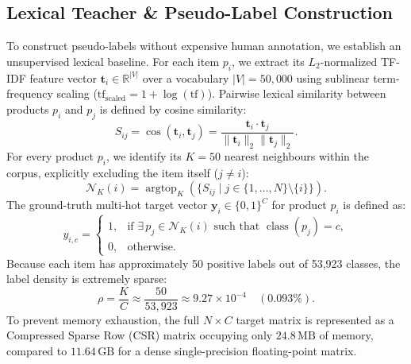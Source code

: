 \documentclass[11pt]{article}
\begin{document}
\subsection{Lexical Teacher \& Pseudo-Label Construction}
To construct pseudo-labels without expensive human annotation, we establish an unsupervised lexical baseline. For each item $p_i$, we extract its $L_2$-normalized TF-IDF feature vector $\mathbf{t}_i \in \mathbb{R}^{|V|}$ over a vocabulary $|V| = 50{,}000$ using sublinear term-frequency scaling ($\text{tf}_{\text{scaled}} = 1 + \log(\text{tf})$). Pairwise lexical similarity between products $p_i$ and $p_j$ is defined by cosine similarity:
\begin{equation}
  S_{ij} = \cos(\mathbf{t}_i, \mathbf{t}_j) = \frac{\mathbf{t}_i \cdot \mathbf{t}_j}{\|\mathbf{t}_i\|_2 \|\mathbf{t}_j\|_2}.
\end{equation}
For every product $p_i$, we identify its $K = 50$ nearest neighbours within the corpus, explicitly excluding the item itself ($j \neq i$):
\begin{equation}
  \mathcal{N}_K(i) = \operatorname{argtop}_K \left( \{ S_{ij} \mid j \in \{1, \dots, N\} \setminus \{i\} \} \right).
\end{equation}
The ground-truth multi-hot target vector $\mathbf{y}_i \in \{0, 1\}^C$ for product $p_i$ is defined as:
\begin{equation}
  y_{i,c} = \begin{cases}
    1, & \text{if } \exists\, p_j \in \mathcal{N}_K(i) \text{ such that } \operatorname{class}(p_j) = c, \\
    0, & \text{otherwise.}
  \end{cases}
\end{equation}
Because each item has approximately 50 positive labels out of 53,923 classes, the label density is extremely sparse:
\begin{equation}
  \rho = \frac{K}{C} \approx \frac{50}{53{,}923} \approx 9.27 \times 10^{-4} \quad (0.093\%).
\end{equation}
To prevent memory exhaustion, the full $N \times C$ target matrix is represented as a Compressed Sparse Row (CSR) matrix occupying only $24.8\,\text{MB}$ of memory, compared to $11.64\,\text{GB}$ for a dense single-precision floating-point matrix.
\end{document}
